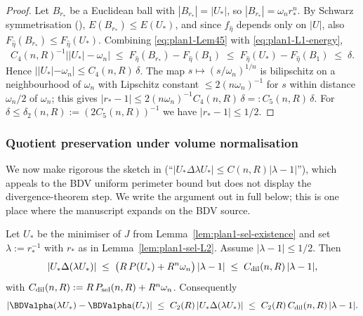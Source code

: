 \begin{proof}
Let $B_{r_*}$ be a Euclidean ball with $|B_{r_*}|=|U_*|$, so
$|B_{r_*}|=\omega_n r_*^{n}$. By Schwarz symmetrisation
(\cite[Thm.~3]{Talenti1976}), $E(B_{r_*})\le E(U_*)$, and since
$f_{\hat\eta}$ depends only on $|U|$, also
$F_{\hat\eta}(B_{r_*})\le F_{\hat\eta}(U_*)$. Combining
\eqref{eq:plan1-Lem45} with \eqref{eq:plan1-L1-energy},
\[
C_4(n,R)^{-1}\bigl||U_*|-\omega_n\bigr|
\;\le\; F_{\hat\eta}(B_{r_*})-F_{\hat\eta}(B_1)
\;\le\; F_{\hat\eta}(U_*)-F_{\hat\eta}(B_1)
\;\le\; \delta.
\]
Hence $||U_*|-\omega_n|\le C_4(n,R)\,\delta$. The map
$s\mapsto (s/\omega_n)^{1/n}$ is bilipschitz on a neighbourhood of
$\omega_n$ with Lipschitz constant $\le 2(n\omega_n)^{-1}$ for $s$
within distance $\omega_n/2$ of $\omega_n$; this gives
$|r_*-1|\le 2(n\omega_n)^{-1}C_4(n,R)\,\delta=:C_5(n,R)\,\delta$. For
$\delta\le \delta_2(n,R):=(2C_5(n,R))^{-1}$ we have $|r_*-1|\le1/2$.
\end{proof}

\subsubsection{Quotient preservation under volume normalisation}
\label{subsubsec:plan1-sel-L3}

We now make rigorous the sketch in
\cite[\S2, Step~1 of Lemma~5.3]{BDV}
(``$|U_*\Delta\lambda U_*|\le C(n,R)|\lambda-1|$''),
which appeals to the BDV uniform perimeter bound but does not display
the divergence-theorem step. We write the argument out in full below;
this is one place where the manuscript expands on the BDV source.

\begin{lemma}
\label{lem:plan1-sel-dilation}
Let $U_*$ be the minimiser of $J$ from Lemma~\ref{lem:plan1-sel-existence}
and set $\lambda:=r_*^{-1}$ with $r_*$ as in Lemma~\ref{lem:plan1-sel-L2}.
Assume $|\lambda-1|\le 1/2$. Then
\begin{equation}\label{eq:plan1-dilL1}
|U_*\Delta(\lambda U_*)|
\;\le\;
\bigl(R\,P(U_*)+R^{n}\omega_n\bigr)\,|\lambda-1|
\;\le\;
C_{\rm dil}(n,R)\,|\lambda-1|,
\end{equation}
with $C_{\rm dil}(n,R):=R\,P_{\rm sel}(n,R)+R^{n}\omega_n$. Consequently
\begin{equation}\label{eq:plan1-dilAlpha}
|\BDValpha(\lambda U_*)-\BDValpha(U_*)|
\;\le\;C_2(R)\,|U_*\Delta(\lambda U_*)|
\;\le\;C_2(R)\,C_{\rm dil}(n,R)\,|\lambda-1|.
\end{equation}
\end{lemma}

